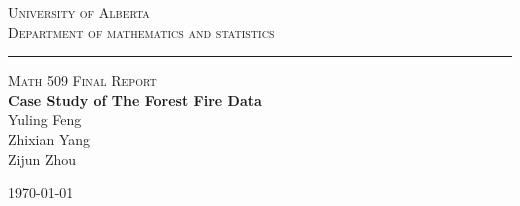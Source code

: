 \documentclass[12pt]{article}
\theoremstyle{plain}
\begin{document}
	\thispagestyle{empty}
	\vspace*{-3cm}
	\begin{center}
		\large \textsc{University of Alberta\\
			Department of mathematics and statistics\\}
		\vspace{0.5cm}
		\hrule
		\vspace{3.0cm}
		{\Large \textsc{ Math 509 Final Report}}\\
		\vspace{1cm}
		{\Large \bf
		Case Study of The Forest Fire Data}\\
		\vspace*{1cm}
		{\large Yuling Feng\\Zhixian Yang\\Zijun Zhou }
	\end{center}
		
				
				
	
	\vfill
	
\begin{center}
{\large \today}
\end{center}	 
 
\newpage
{}
 
\tableofcontents
\end{document}
